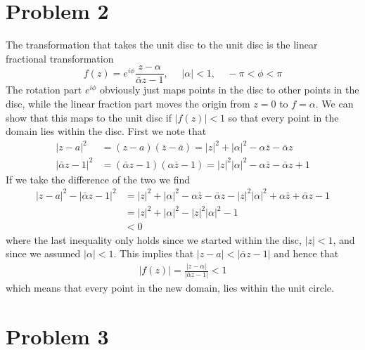 \documentclass[a4paper,12pt]{article}
\begin{document}
\section*{Problem 2}
The transformation that takes the unit disc to the unit disc is the linear fractional transformation
\begin{equation}
f(z)= e^{i\phi}\frac{z-\alpha}{\bar \alpha z-1},~~~~~~|\alpha|<1,~~~~~-\pi<\phi < \pi
\end{equation}
The rotation part $e^{i\phi}$ obviously just maps points in the disc to other points in the disc, while the linear fraction part moves the origin from $z=0$ to $f=\alpha$. We can show that this maps to the unit disc if $|f(z)|<1$ so that every point in the domain lies within the disc. First we note that
\begin{equation}
\begin{aligned}
|z-a|^2&=(z-a)(\bar z-\bar a)=|z|^2+|\alpha|^2-\alpha \bar z-\bar \alpha z\\
|\bar \alpha z-1|^2&=(\bar \alpha z-1)( \alpha \bar z-1)=|z|^2|\alpha|^2-\alpha \bar z-\bar \alpha z+1
\end{aligned}
\end{equation}
If we take the difference of the two we find
\begin{equation}
\begin{aligned}
|z-a|^2-|\bar \alpha z-1|^2&=|z|^2+|\alpha|^2-\alpha \bar z-\bar \alpha z-|z|^2|\alpha|^2+\alpha \bar z+\bar \alpha z-1\\
&=|z|^2+|\alpha|^2-|z|^2|\alpha|^2-1\\
&<0
\end{aligned}
\end{equation}
where the last inequality only holds since we started within the disc, $|z|<1$, and since we assumed $|\alpha|<1$. This implies that $|z-a|<|\bar \alpha z-1|$ and hence that 
\begin{equation}
\begin{aligned}
|f(z)|=\frac{|z-\alpha|}{|\bar \alpha z-1|}<1
\end{aligned}
\end{equation}
which means that every point in the new domain, lies within the unit circle.  
\section*{Problem 3}
\end{document}
